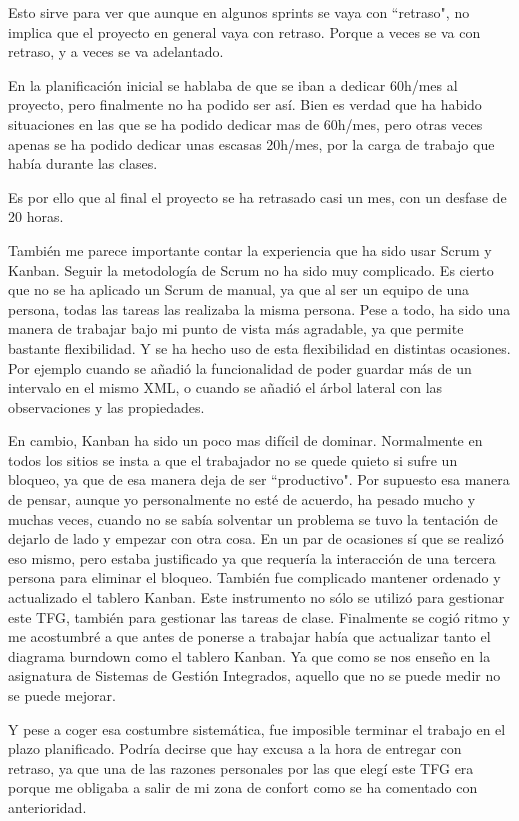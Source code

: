 Esto sirve para ver que aunque en algunos sprints se vaya con ``retraso", no implica que el proyecto
en general vaya con retraso. Porque a veces se va con retraso, y a veces se va adelantado.

En la planificaci\'on inicial se hablaba de que se iban a dedicar 60h/mes al proyecto,
pero finalmente no ha podido ser as\'i. Bien es verdad que ha habido situaciones en las
que se ha podido dedicar mas de 60h/mes, pero otras veces apenas se ha podido dedicar
unas escasas 20h/mes, por la carga de trabajo que hab\'ia durante las clases.

Es por ello que al final el proyecto se ha retrasado casi un mes, con un desfase de 20 horas.

Tambi\'en me parece importante contar la experiencia que ha sido usar Scrum y Kanban. 
Seguir la metodolog\'ia de Scrum no ha sido muy complicado. Es cierto que no se ha aplicado
un Scrum de manual, ya que al ser un equipo de una persona, todas las tareas las realizaba la 
misma persona. Pese a todo, ha sido una manera de trabajar bajo mi punto de vista m\'as agradable,
ya que permite bastante flexibilidad. Y se ha hecho uso de esta flexibilidad en distintas ocasiones.
Por ejemplo cuando se a\~nadi\'o la funcionalidad de poder guardar m\'as de un intervalo en el mismo
XML, o cuando se a\~nadi\'o el \'arbol lateral con las observaciones y las propiedades.

En cambio, Kanban ha sido un poco mas dif\'icil de dominar. 
Normalmente en todos los sitios se insta
a que el trabajador no se quede quieto si sufre un bloqueo, 
ya que de esa manera deja de ser ``productivo". Por supuesto
esa manera de pensar, aunque yo personalmente no est\'e de acuerdo, ha pesado 
mucho y 
muchas veces, cuando no se sab\'ia solventar un problema se tuvo la 
tentaci\'on de dejarlo de lado y empezar con otra cosa. En un par de ocasiones 
s\'i que se 
realiz\'o eso mismo, pero estaba justificado
ya que requer\'ia la interacci\'on de una tercera persona para eliminar el 
bloqueo. Tambi\'en fue complicado mantener
ordenado y actualizado el tablero Kanban. Este instrumento no s\'olo 
se utiliz\'o para gestionar este TFG, tambi\'en para gestionar 
las tareas de clase. Finalmente se cogi\'o ritmo
y me acostumbr\'e a que antes de ponerse a trabajar hab\'ia que 
actualizar tanto el diagrama burndown como el tablero Kanban. 
Ya que como se nos ense\~no en la asignatura de Sistemas de Gesti\'on 
Integrados,
aquello que no se puede medir no se puede mejorar.

Y pese a coger esa costumbre sistem\'atica, fue imposible terminar el trabajo en el
plazo planificado. Podr\'ia decirse que hay excusa a la hora de entregar con retraso,
ya que una de las razones personales por las que eleg\'i este TFG era porque me
obligaba a salir de mi zona de confort como se ha comentado con anterioridad.

